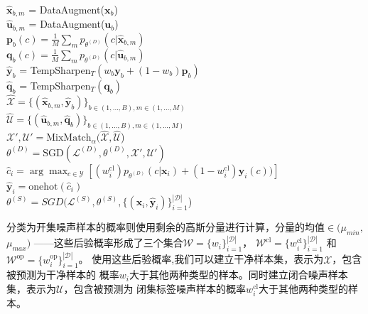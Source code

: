\documentclass[11pt]{article}
\begin{document}
\begin{algorithm}[H]
{{               
            {
                {
                    $\hat{\mathbf{x}}_{b,m}$ = DataAugment($\mathbf{x}_b$)  \\
                    $\hat{\mathbf{u}}_{b,m}$ = DataAugment($\mathbf{u}_b$) \\
                }
                {
                    $\mathbf{p}_b(c) = \frac{1}{M}\sum_m p_{\theta^{(D)}}(c|\hat{\mathbf{x}}_{b,m})$\\
                    $\mathbf{q}_b(c) = \frac{1}{M}\sum_m p_{\theta^{(D)}}(c | \hat{\mathbf{u}}_{b,m})$ \\
                }
                $\hat{\mathbf{y}}_b$ = TempSharpen$_{T}(w_b \mathbf{y}_b + (1-w_b)\mathbf{p}_b)$ \\
                $\hat{\mathbf{q}}_b$ = TempSharpen$_{T}(\mathbf{q}_b)$ \\
            }
            $\hat{\mathcal{X}} = \{(\hat{\mathbf{x}}_{b,m},\hat{\mathbf{y}}_b)\}_{b \in (1,...,B), m \in (1,...,M)}$ \\
            $\hat{\mathcal{U}} = \{(\hat{\mathbf{u}}_{b,m},\hat{\mathbf{q}}_b) \}_{b \in (1,...,B), m \in (1,...,M)}$ \\
            $\mathcal{X}', \mathcal{U}' = \text{MixMatch}_{\alpha}(\hat{\mathcal{X}},\hat{\mathcal{U}}$) \\
            $\theta^{(D)} = \text{SGD}(\mathcal{L}^{(D)},\theta^{(D)},\mathcal{X}', \mathcal{U}')$ \\
        }
        {
            $\hat{c}_i = \arg\max_{c \in \mathcal{Y}} \left [ (w_i^{\text{cl}}) p_{\theta^{(D)}}(c|\mathbf{x}_i) +
                (1-w_i^{\text{cl}}) \mathbf{y}_i(c)) \right ]$\\
            $\hat{\mathbf{y}}_i = \text{onehot}(\hat{c}_i) $\\
        }
        $\theta^{(S)} = SGD(\mathcal{L}^{(S)},\theta^{(S)},\{ (\mathbf{x}_i,\hat{\mathbf{y}}_i) \}_{i=1}^{|\mathcal{D}|}$) \\
 }
 
\end{algorithm}

\newpage
分类为开集噪声样本的概率则使用剩余的高斯分量进行计算，分量的均值$\in(\mu_{min},$  $\mu_{max})$ 
——这些后验概率形成了三个集合$\mathcal{W}=\{ w_i \}_{i=1}^{|\mathcal{D}|}$，
$\mathcal{W}^{\text{cl}}=\{ w^{\text{cl}}_i \}_{i=1}^{|\mathcal{D}|}$ 
和 $\mathcal{W}^{\text{op}}=\{ w^{\text{op}}_i \}_{i=1}^{|\mathcal{D}|}$。
使用这些后验概率,我们可以建立干净样本集，表示为$\mathcal{X}$，包含被预测为干净样本的
概率$w_i$大于其他两种类型的样本。同时建立闭合噪声样本集，表示为$\mathcal{U}$，包含被预测为
闭集标签噪声样本的概率$w_i^{\text{cl}}$大于其他两种类型的样本。
\end{document}
